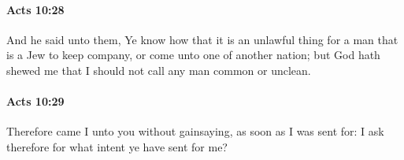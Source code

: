 		\paragraph{Acts 10:28} %
			\label{ACTS-10-28}

			And he said unto them, Ye know how that it is an unlawful thing for a man that is a Jew to keep company, or come unto one of another nation; but God hath shewed me that I should not call any man common or unclean.

			\begin{framed}
			\scriptsize
				\begin{compactdesc}
					\item[SBLG] 
				\end{compactdesc}
			\end{framed}

		\paragraph{Acts 10:29} %
			\label{ACTS-10-29}

			Therefore came I unto you without gainsaying, as soon as I was sent for: I ask therefore for what intent ye have sent for me?

